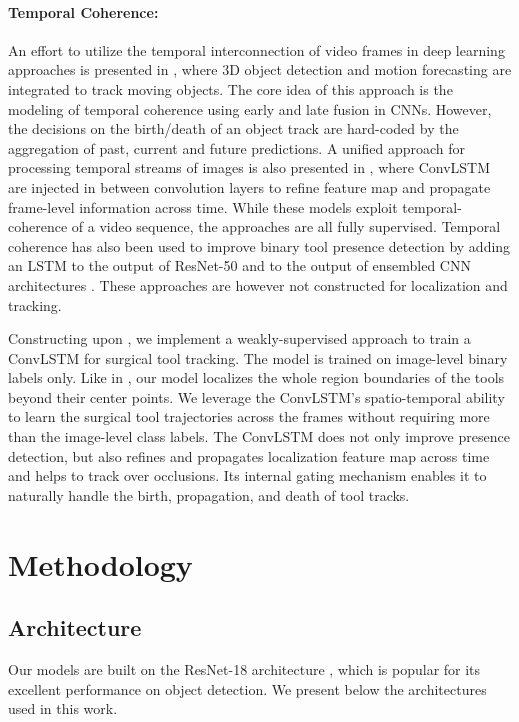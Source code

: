 \documentclass{svjour3}                     \smartqed
\begin{document}
\paragraph{\textbf{Temporal Coherence:}}
An effort to utilize the temporal interconnection of video frames in deep learning approaches is presented in \cite{cvpr:luo2018fast}, where 3D object detection and motion forecasting are integrated to track moving objects. 
The core idea of this approach is the modeling of temporal coherence using early and late fusion in CNNs. 
However, the decisions on the birth/death of an object track are hard-coded by the aggregation of past, current and future predictions.
A unified approach for processing temporal streams of images is also presented in \cite{arXiv:liu2017mobile}, where ConvLSTM are injected in between convolution layers to refine feature map and propagate frame-level information across time. 
While these models exploit temporal-coherence of a video sequence, the approaches are all fully supervised.
Temporal coherence has also been used to improve binary tool presence detection by adding an LSTM to the output of ResNet-50 \cite{cvpr:mishra2017learning} and to the output of ensembled CNN architectures \cite{mai:al2018monitoring}. These approaches are however not constructed for localization and tracking.

\medskip
\noindent Constructing upon \cite{miccai:vardazaryan2018weakly}, we implement a weakly-supervised approach to train a ConvLSTM for surgical tool tracking. The model is trained on image-level binary labels only. 
Like in \cite{wacv:jin2018tool}, our model localizes the whole region boundaries of the tools beyond their center points.
We leverage the ConvLSTM's spatio-temporal ability to learn the surgical tool trajectories across the frames without requiring more than the image-level class labels.
The ConvLSTM does not only improve presence detection, but also refines and propagates localization feature map across time and helps to track over occlusions. 
Its internal gating mechanism enables it to naturally handle the birth, propagation, and death of tool tracks.


\section{Methodology}
\label{sec:methodology}
\subsection{Architecture}\label{sec:architecture}
Our models are built on the ResNet-18 architecture \cite{cvpr:he2016deep}, which is popular for its excellent performance on object detection. 
We present below the architectures used in this work.
\end{document}
